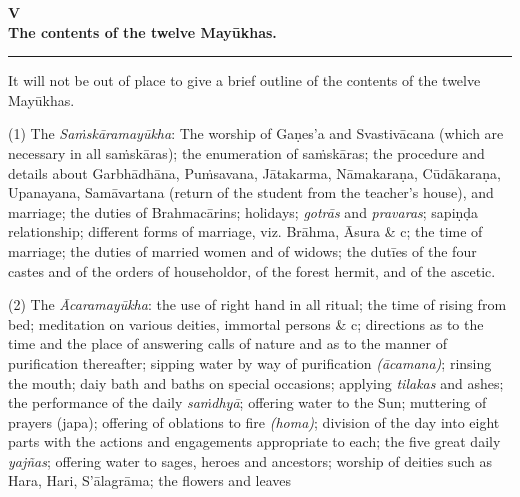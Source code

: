 \documentclass[11pt, openany]{book}
\begin{document}
\newpage

\begin{center}
\textbf{\large V}\\

\vspace{1mm}
\textbf{\large The contents of the twelve Mayūkhas.}\\

\rule{0.2\linewidth}{0.5pt}
\end{center}

It will not be out of place to give a brief outline of the contents of the twelve Mayūkhas.

(1) The \emph{\en Saṁskāramayūkha}: The worship of Gaṇes'a and Svastivācana (which are necessary in all saṁskāras); the enumeration of saṁskāras; the procedure and details about Garbhādhāna, Puṁsavana, Jātakarma, Nāmakaraṇa, Cūdākaraṇa, Upanayana, Samāvartana (return of the student from the teacher's house), and marriage; the duties of Brahmacārins; holidays; \emph{\en gotrās} and \emph{\en pravaras}; sapiṇḍa relationship; different forms of marriage, viz. Brāhma, Āsura \& c; the time of marriage; the duties of married women and of widows; the dutīes of the four castes and of the orders of householdor, of the forest hermit, and of the ascetic.

(2) The \emph{\en Ācaramayūkha}: the use of right hand in all ritual; the time of rising from bed; meditation on various deities, immortal persons \& c; directions as to the time and the place of answering calls of nature and as to the manner of purification thereafter; sipping water by way of purification \emph{\en (ācamana)}; rinsing the mouth; daiy bath and baths on special occasions; applying \emph{\en tilakas} and ashes; the performance of the daily \emph{\en saṁdhyā}; offering water to the Sun; muttering of prayers (japa); offering of oblations to fire \emph{\en (homa)}; division of the day into eight parts with the actions and engagements appropriate to each; the five great daily \emph{\en yajñas}; offering water to sages, heroes and ancestors; worship of deities such as Hara, Hari, S'ālagrāma; the flowers and leaves 

\fancyhead[RE,LO]{\thepage}
\cfoot{}
\newpage
\renewcommand{\thepage}{\Roman{page}}
\setcounter{page}{29}

\end{document}
